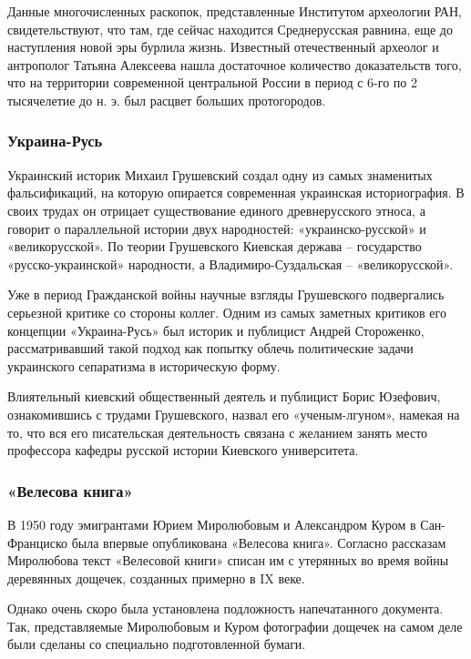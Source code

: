Данные многочисленных раскопок, представленные Институтом археологии РАН,
свидетельствуют, что там, где сейчас находится Среднерусская равнина, еще до
наступления новой эры бурлила жизнь. Известный отечественный археолог и
антрополог Татьяна Алексеева нашла достаточное количество доказательств того,
что на территории современной центральной России в период с 6-го по 2
тысячелетие до н. э. был расцвет больших протогородов.

\subsubsection{Украина-Русь}


Украинский историк Михаил Грушевский создал одну из самых знаменитых
фальсификаций, на которую опирается современная украинская историография. В
своих трудах он отрицает существование единого древнерусского этноса, а говорит
о параллельной истории двух народностей: «украинско-русской» и «великорусской».
По теории Грушевского Киевская держава – государство «русско-украинской»
народности, а Владимиро-Суздальская – «великорусской».

Уже в период Гражданской войны научные взгляды Грушевского подвергались
серьезной критике со стороны коллег. Одним из самых заметных критиков его
концепции «Украина-Русь» был историк и публицист Андрей Стороженко,
рассматривавший такой подход как попытку облечь политические задачи украинского
сепаратизма в историческую форму.

Влиятельный киевский общественный деятель и публицист Борис Юзефович,
ознакомившись с трудами Грушевского, назвал его «ученым-лгуном», намекая на то,
что вся его писательская деятельность связана с желанием занять место
профессора кафедры русской истории Киевского университета.

\subsubsection{«Велесова книга»}

В 1950 году эмигрантами Юрием Миролюбовым и Александром Куром в Сан-Франциско
была впервые опубликована «Велесова книга». Согласно рассказам Миролюбова текст
«Велесовой книги» списан им с утерянных во время войны деревянных дощечек,
созданных примерно в IX веке.

Однако очень скоро была установлена подложность напечатанного документа. Так,
представляемые Миролюбовым и Куром фотографии дощечек на самом деле были
сделаны со специально подготовленной бумаги.

